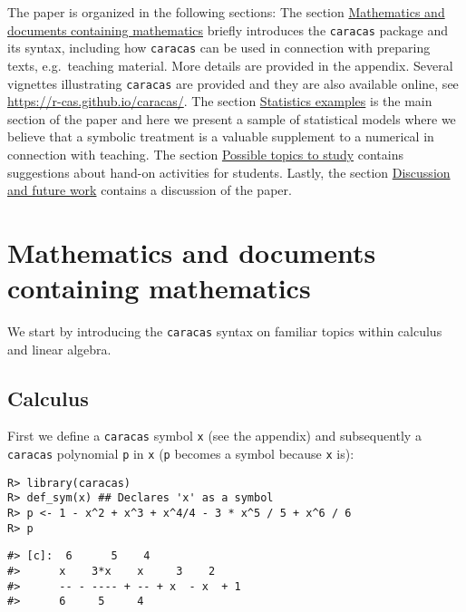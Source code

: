 The paper is organized in the following sections:
The section \protect\hyperlink{mathematics-and-documents-containing-mathematics}{Mathematics and documents containing mathematics} briefly introduces the \texttt{caracas} package
and its syntax, including
how \texttt{caracas} can be used in connection with preparing texts, e.g.~teaching
material.
More details are provided in the appendix.
Several vignettes illustrating
\texttt{caracas} are provided and they are also available online, see
\url{https://r-cas.github.io/caracas/}.
The section \protect\hyperlink{statistics-examples}{Statistics examples} is the main section of the
paper and here we present a sample of statistical models where we
believe that a symbolic treatment is a valuable supplement to a
numerical in connection with teaching.
The section \protect\hyperlink{possible-topics-to-study}{Possible topics to study} contains suggestions about
hand-on activities for students.
Lastly,
the section \protect\hyperlink{discussion-and-future-work}{Discussion and future work} contains a discussion of the paper.

\hypertarget{mathematics-and-documents-containing-mathematics}{%
\section{Mathematics and documents containing mathematics}\label{mathematics-and-documents-containing-mathematics}}

We start by introducing the \texttt{caracas} syntax on familiar topics within calculus
and linear algebra.

\hypertarget{calculus}{%
\subsection{Calculus}\label{calculus}}

First we define a \texttt{caracas} symbol \texttt{x} (see the appendix) and
subsequently a \texttt{caracas} polynomial \texttt{p} in \texttt{x} (\texttt{p} becomes a symbol because \texttt{x} is):

\begin{verbatim}
R> library(caracas)
R> def_sym(x) ## Declares 'x' as a symbol
R> p <- 1 - x^2 + x^3 + x^4/4 - 3 * x^5 / 5 + x^6 / 6
R> p
\end{verbatim}

\begin{verbatim}
#> [c]:  6      5    4              
#>      x    3*x    x     3    2    
#>      -- - ---- + -- + x  - x  + 1
#>      6     5     4
\end{verbatim}

